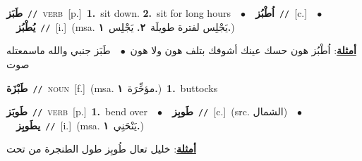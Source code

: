\documentclass[10pt,a4paper,twoside]{article} %
\begin{document}
\begin{multicols}{2}
{\setlength\topsep{0pt}\textbf{\foreignlanguage{arabic}{طَبَز}}\ {\color{gray}\texttt{//}\color{black}}\ \textsc{verb}\ [p.]\ \textbf{1.}~sit down.  \textbf{2.}~sit for long hours\ \ $\bullet$\ \ \setlength\topsep{0pt}\textbf{\foreignlanguage{arabic}{اُطْبُز}}\ {\color{gray}\texttt{//}\color{black}}\ [c.]\ \ $\bullet$\ \ \setlength\topsep{0pt}\textbf{\foreignlanguage{arabic}{يُطْبُز}}\ {\color{gray}\texttt{//}\color{black}}\ [i.]\ \color{gray}(msa. \foreignlanguage{arabic}{يَجْلِس لفترة طويلَة}~\foreignlanguage{arabic}{\textbf{٢.}}  \foreignlanguage{arabic}{يَجْلِس}~\foreignlanguage{arabic}{\textbf{١.}})\color{black}\  \begin{flushright}\color{gray}\foreignlanguage{arabic}{\textbf{\underline{\foreignlanguage{arabic}{أمثلة}}}: اُطْبُز هون حسك عينك أشوفك بتلف هون ولا هون\ $\bullet$\ \  طَبَز جنبي والله ماسمعتله صوت}\end{flushright}\color{black}} \vspace{2mm}

{\setlength\topsep{0pt}\textbf{\foreignlanguage{arabic}{طَبْزَة}}\ {\color{gray}\texttt{//}\color{black}}\ \textsc{noun}\ [f.]\ \color{gray}(msa. \foreignlanguage{arabic}{مؤخِّرَة}~\foreignlanguage{arabic}{\textbf{١.}})\color{black}\ \textbf{1.}~buttocks\ } \vspace{2mm}

{\setlength\topsep{0pt}\textbf{\foreignlanguage{arabic}{طَوبَز}}\ {\color{gray}\texttt{//}\color{black}}\ \textsc{verb}\ [p.]\ \textbf{1.}~bend over\ \ $\bullet$\ \ \setlength\topsep{0pt}\textbf{\foreignlanguage{arabic}{طَوبِز}}\ {\color{gray}\texttt{//}\color{black}}\ [c.]\ (src. \color{gray}\foreignlanguage{arabic}{الشمال}\color{black})\ \ $\bullet$\ \ \setlength\topsep{0pt}\textbf{\foreignlanguage{arabic}{يطَوبِز}}\ {\color{gray}\texttt{//}\color{black}}\ [i.]\ \color{gray}(msa. \foreignlanguage{arabic}{يَنْحَنِي}~\foreignlanguage{arabic}{\textbf{١.}})\color{black}\  \begin{flushright}\color{gray}\foreignlanguage{arabic}{\textbf{\underline{\foreignlanguage{arabic}{أمثلة}}}: خليل تعال طُوبِز طول الطنجرة من تحت}\end{flushright}\color{black}} \vspace{2mm}


\end{multicols}
\end{document}
